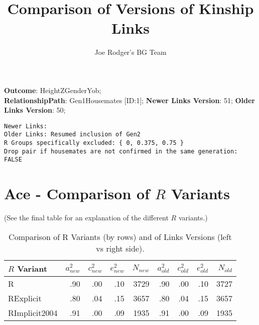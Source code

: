 \documentclass{article}\usepackage{graphicx, color}
\title{Comparison of Versions of Kinship Links}
\author{Joe Rodger's BG Team}
\makeatletter
\newenvironment{kframe}{%
 \def\at@end@of@kframe{}%
 \ifinner\ifhmode%
  \def\at@end@of@kframe{\end{minipage}}%
  \begin{minipage}{\columnwidth}%
 \fi\fi%
 \def\FrameCommand##1{\hskip\@totalleftmargin \hskip-\fboxsep
 \colorbox{shadecolor}{##1}\hskip-\fboxsep
     \hskip-\linewidth \hskip-\@totalleftmargin \hskip\columnwidth}%
 \MakeFramed {\advance\hsize-\width
   \@totalleftmargin\z@ \linewidth\hsize
   \@setminipage}}%
 {\par\unskip\endMakeFramed%
 \at@end@of@kframe}
\newenvironment{knitrout}{}{} %
\makeatother
\begin{document}
\maketitle
\setcounter{totalnumber}{8} %

\setlength{\parindent}{0pt}%







\textbf{Outcome}: HeightZGenderYob;\\
\textbf{RelationshipPath}: Gen1Housemates [ID:1];
\textbf{Newer Links Version}: 51;
\textbf{Older Links Version}: 50;

\begin{knitrout}
\color{fgcolor}\begin{kframe}
\begin{verbatim}
Newer Links:
Older Links: Resumed inclusion of Gen2
R Groups specifically excluded: { 0, 0.375, 0.75 }
Drop pair if housemates are not confirmed in the same generation: FALSE\end{verbatim}
\end{kframe}
\end{knitrout}





\section{Ace - Comparison of $R$ Variants} 
(See the final table for an explanation of the different $R$ variants.)

\begin{table}[ht]
\begin{center}
{\large
\begin{tabular}{l|rrrr|rrrr}
  \hline
$R$ Variant & $a_{new}^2$ & $c_{new}^2$ & $e_{new}^2$ & $N_{new}$ & $a_{old}^2$ & $c_{old}^2$ & $e_{old}^2$ & $N_{old}$ \\ 
  \hline
R & .90 & .00 & .10 & 3729 & .90 & .00 & .10 & 3727 \\ 
  RExplicit & .80 & .04 & .15 & 3657 & .80 & .04 & .15 & 3657 \\ 
  RImplicit2004 & .91 & .00 & .09 & 1935 & .91 & .00 & .09 & 1935 \\ 
   \hline
\end{tabular}
}
\caption{Comparison of R Variants (by rows) and of Links Versions (left vs right side).}
\end{center}
\end{table}
\end{document}
